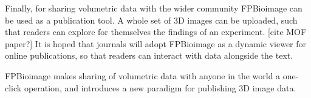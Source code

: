 Finally, for sharing volumetric data with the wider community FPBioimage can be used as a publication tool. 
A whole set of 3D images can be uploaded, such that readers can explore for themselves the findings of an experiment. [cite MOF paper?]
It is hoped that journals will adopt FPBioimage as a dynamic viewer for online publications, so that readers can interact with data alongside the text. 

FPBioimage makes sharing of volumetric data with anyone in the world a one-click operation, and introduces a new paradigm for publishing 3D image data. 